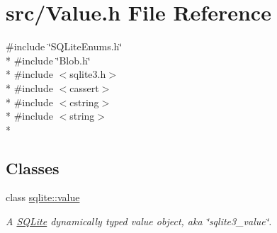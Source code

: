 \hypertarget{a00037}{\section{src/\-Value.h File Reference}
\label{a00037}
}
{\ttfamily \#include \char`\"{}S\-Q\-Lite\-Enums.\-h\char`\"{}}\\*
{\ttfamily \#include \char`\"{}Blob.\-h\char`\"{}}\\*
{\ttfamily \#include $<$sqlite3.\-h$>$}\\*
{\ttfamily \#include $<$cassert$>$}\\*
{\ttfamily \#include $<$cstring$>$}\\*
{\ttfamily \#include $<$string$>$}\\*
\subsection*{Classes}
\begin{DoxyCompactItemize}
\item 
class \hyperlink{a00015}{sqlite\-::value}
\begin{DoxyCompactList}\small\item\em A \hyperlink{a00038}{S\-Q\-Lite} dynamically typed value object, aka \char`\"{}sqlite3\-\_\-value\char`\"{}. \end{DoxyCompactList}\end{DoxyCompactItemize}
